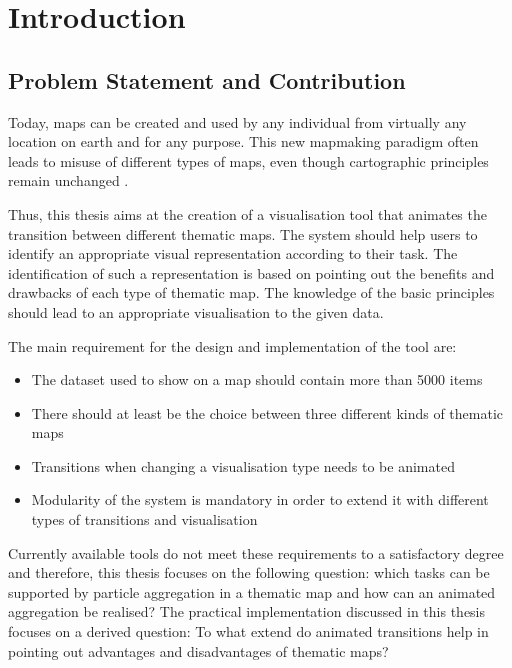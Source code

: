 \section{Introduction}


\subsection{Problem Statement and Contribution}
Today, maps can be created and used by any individual from virtually any location on earth and for any purpose. This new mapmaking paradigm often leads to misuse of different types of maps, even though cartographic principles remain unchanged .


Thus, this thesis aims at the creation of a visualisation tool that animates the transition between different thematic maps. The system should help users to identify an appropriate visual representation according to their task. The identification of such a representation is based on pointing out the benefits and drawbacks of each type of thematic map. The knowledge of the basic principles should lead to an appropriate visualisation to the given data.

The main requirement for the design and implementation of the tool are:
\begin{itemize}
\item The dataset used to show on a map should contain more than 5000 items
\item There should at least be the choice between three different kinds of thematic maps
\item Transitions when changing a visualisation type needs to be animated
\item Modularity of the system is mandatory in order to extend it with different types of transitions and visualisation
\end{itemize}
Currently available tools do not meet these requirements to a satisfactory degree and therefore, this thesis focuses on the following question:
which tasks can be supported by particle aggregation in a thematic map and how can an animated aggregation be realised? The practical implementation discussed in this thesis focuses on a derived question: To what extend do animated transitions help in pointing out advantages and disadvantages of thematic maps?

